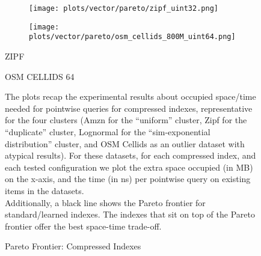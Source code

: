 \documentclass{article}
\begin{document}
\begin{figure}[!htbp]
{\begin{minipage}[t][0.98\textheight][t]{\textwidth}
    \begin{minipage}{0.48\linewidth}
        \begin{figure}[H]
        \texttt{[image: plots/vector/pareto/zipf\_uint32.png]}
        \end{figure}
    \end{minipage}
    \begin{minipage}{0.48\linewidth}
        \begin{figure}[H]
        \texttt{[image: plots/vector/pareto/osm\_cellids\_800M\_uint64.png]}
        \end{figure}
    \end{minipage}
    \begin{minipage}{0.48\linewidth}
    \begin{center}
        ZIPF
    \end{center}
    \end{minipage}
    \begin{minipage}{0.48\linewidth}
    \begin{center}
        OSM CELLIDS 64
    \end{center}
    \end{minipage}

    \vspace{20px}
    
    \begin{minipage}{\linewidth}
        The plots recap the experimental results about occupied space/time needed for pointwise queries for compressed indexes, representative for the four clusters (Amzn for the ``uniform'' cluster, Zipf for the ``duplicate'' cluster, Lognormal for the ``sim-exponential distribution'' cluster, and OSM Cellids as an outlier dataset with atypical results). For these datasets, for each compressed index, and each tested configuration we plot the extra space occupied (in MB) on the x-axis, and the time (in ns) per pointwise query on existing items in the datasets. \\

    Additionally, a black line shows the Pareto frontier for standard/learned indexes. The indexes that sit on top of the Pareto frontier offer the best space-time trade-off. 
            \end{minipage}
    \vspace{10px}
\end{minipage}
}
\caption{Pareto Frontier: Compressed Indexes}
\end{figure}
\end{document}
